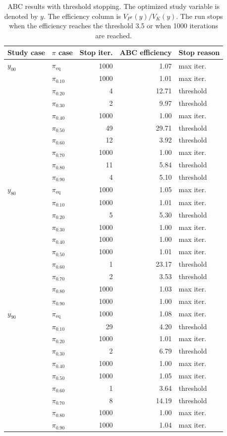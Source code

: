 \begin{table}[!htbp]
\centering
\small
\caption{ABC results with threshold stopping. The optimized study variable is denoted by \(y\). The efficiency column is \(V_{P^\pi}(y)/V_K(y)\). The run stops when the efficiency reaches the threshold 3.5 or when 1000 iterations are reached.}
\label{tab:abc-threshold-results}
\begin{tabular}{llrrl}
\toprule
Study case & \(\pi\) case & Stop iter. & ABC efficiency & Stop reason \\
\midrule
\(y_{00}\) & \(\pi_{\mathrm{eq}}\) & 1000 & 1.07 & max iter. \\ 
 & \(\pi_{0.10}\) & 1000 & 1.01 & max iter. \\ 
 & \(\pi_{0.20}\) & 4 & 12.71 & threshold \\ 
 & \(\pi_{0.30}\) & 2 & 9.97 & threshold \\ 
 & \(\pi_{0.40}\) & 1000 & 1.00 & max iter. \\ 
 & \(\pi_{0.50}\) & 49 & 29.71 & threshold \\ 
 & \(\pi_{0.60}\) & 12 & 3.92 & threshold \\ 
 & \(\pi_{0.70}\) & 1000 & 1.00 & max iter. \\ 
 & \(\pi_{0.80}\) & 11 & 5.84 & threshold \\ 
 & \(\pi_{0.90}\) & 4 & 5.10 & threshold \\ 
\addlinespace
\(y_{80}\) & \(\pi_{\mathrm{eq}}\) & 1000 & 1.05 & max iter. \\ 
 & \(\pi_{0.10}\) & 1000 & 1.01 & max iter. \\ 
 & \(\pi_{0.20}\) & 5 & 5.30 & threshold \\ 
 & \(\pi_{0.30}\) & 1000 & 1.00 & max iter. \\ 
 & \(\pi_{0.40}\) & 1000 & 1.00 & max iter. \\ 
 & \(\pi_{0.50}\) & 1000 & 1.01 & max iter. \\ 
 & \(\pi_{0.60}\) & 1 & 23.17 & threshold \\ 
 & \(\pi_{0.70}\) & 2 & 3.53 & threshold \\ 
 & \(\pi_{0.80}\) & 1000 & 1.03 & max iter. \\ 
 & \(\pi_{0.90}\) & 1000 & 1.00 & max iter. \\ 
\addlinespace
\(y_{90}\) & \(\pi_{\mathrm{eq}}\) & 1000 & 1.08 & max iter. \\ 
 & \(\pi_{0.10}\) & 29 & 4.20 & threshold \\ 
 & \(\pi_{0.20}\) & 1000 & 1.01 & max iter. \\ 
 & \(\pi_{0.30}\) & 2 & 6.79 & threshold \\ 
 & \(\pi_{0.40}\) & 1000 & 1.00 & max iter. \\ 
 & \(\pi_{0.50}\) & 1000 & 1.05 & max iter. \\ 
 & \(\pi_{0.60}\) & 1 & 3.64 & threshold \\ 
 & \(\pi_{0.70}\) & 8 & 14.19 & threshold \\ 
 & \(\pi_{0.80}\) & 1000 & 1.00 & max iter. \\ 
 & \(\pi_{0.90}\) & 1000 & 1.04 & max iter. \\ 
\bottomrule
\end{tabular}
\end{table}
